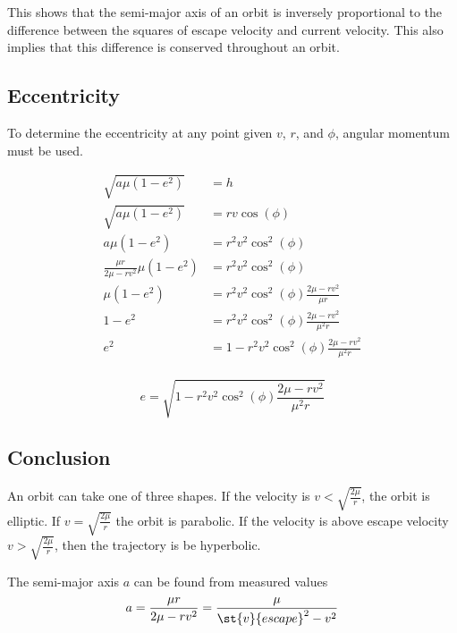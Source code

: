 \documentclass[../basicOrbitalDynamics.tex]{subfiles}
\begin{document}
This shows that the semi-major axis of an orbit is inversely proportional to the difference between the squares of escape velocity and current velocity. This also implies that this difference is conserved throughout an orbit.

\bigskip\bigskip
\subsection{Eccentricity}\label{sec:Eccentricity in Terms of V,R}

To determine the eccentricity at any point given $v$, $r$, and $\phi$, angular momentum must be used.

\begin{align*}
    \sqrt{a\mu(1-e^2)}                & =h                                            \\
    \sqrt{a\mu(1-e^2)}                & =rv\cos(\phi)                                 \\
    a\mu(1-e^2)                       & =r^2v^2\cos^2(\phi)                           \\
    \frac{\mu r}{2\mu-rv^2}\mu(1-e^2) & =r^2v^2\cos^2(\phi)                           \\
    \mu(1-e^2)                        & =r^2v^2\cos^2(\phi)\frac{2\mu-rv^2}{\mu r}    \\
    1-e^2                             & =r^2v^2\cos^2(\phi)\frac{2\mu-rv^2}{\mu^2r}   \\
    e^2                               & =1-r^2v^2\cos^2(\phi)\frac{2\mu-rv^2}{\mu^2r} \\
\end{align*}

\begin{equation}
    e=\sqrt{1-r^2v^2\cos^2(\phi)\frac{2\mu-rv^2}{\mu^2r}}
\end{equation}

\bigskip\bigskip
\subsection{Conclusion}

\bigskip
An orbit can take one of three shapes. If the velocity is $v<\sqrt{\frac{2\mu}{r}}$, the orbit is elliptic. If $v=\sqrt{\frac{2\mu}{r}}$ the orbit is parabolic. If the velocity is above escape velocity $v>\sqrt{\frac{2\mu}{r}}$, then the trajectory is be hyperbolic.

\bigskip
The semi-major axis $a$ can be found from measured values
$$a=\frac{\mu r}{2\mu-rv^2}=\frac{\mu}{\st{v}{escape}^2-v^2}$$
\end{document}
